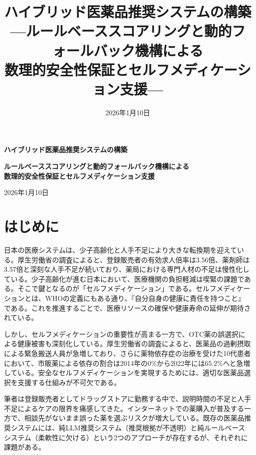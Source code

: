 \documentclass[a4paper,11pt,ja=standard,xelatex]{bxjsarticle}
\title{ハイブリッド医薬品推奨システムの構築\\
\large{---ルールベーススコアリングと動的フォールバック機構による\\数理的安全性保証とセルフメディケーション支援---}}
\author{}
\date{2026年1月10日}
\theoremstyle{definition}
\begin{document}
\thispagestyle{empty}
\begin{center}
\vspace*{2.5cm}

{\LARGE \textbf{ハイブリッド医薬品推奨システムの構築}}

\vspace{1.5cm}

{\Large \textbf{ルールベーススコアリングと動的フォールバック機構による\\数理的安全性保証とセルフメディケーション支援}}

\vspace{6cm}

{\large 2026年1月10日}

\vspace{2cm}

\end{center}

\newpage

\setcounter{page}{1}

\section{はじめに}

日本の医療システムは、少子高齢化と人手不足により大きな転換期を迎えている。厚生労働省の調査によると、登録販売者の有効求人倍率は3.56倍、薬剤師は3.57倍と深刻な人手不足が続いており、薬局における専門人材の不足は慢性化している。少子高齢化が進む日本において、医療機関の負担軽減は喫緊の課題である。そこで鍵となるのが「セルフメディケーション」である。セルフメディケーションとは、WHOの定義にもある通り、『自分自身の健康に責任を持つこと』である。これを推進することで、医療リソースの確保や健康寿命の延伸が期待されている。

しかし、セルフメディケーションの重要性が高まる一方で、OTC薬の誤選択による健康被害も深刻化している。厚生労働省の調査によると、医薬品の過剰摂取による緊急搬送人員が急増しており、さらに薬物依存症の治療を受けた10代患者において、市販薬による依存の割合は2014年の0\%から2022年には65.2\%へと急増している。安全なセルフメディケーションを実現するためには、適切な医薬品選択を支援する仕組みが不可欠である。

筆者は登録販売者としてドラッグストアに勤務する中で、説明時間の不足と人手不足によるケアの限界を痛感してきた。インターネットでの薬購入が普及する一方で、相談先がないまま誤った薬を選ぶリスクが増大している。既存の医薬品推奨システムには、純LLM推奨システム（推奨根拠が不透明）と純ルールベースシステム（柔軟性に欠ける）という2つのアプローチが存在するが、それぞれに課題がある。
\end{document}
